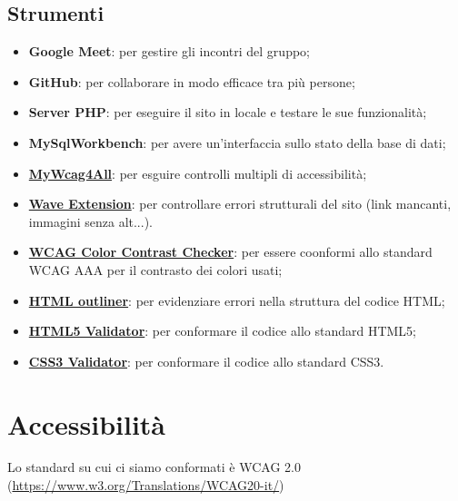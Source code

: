 \documentclass{template}
\begin{document}
	\subsection{Strumenti}
	\begin{itemize}
		\item \textbf{Google Meet}: per gestire gli incontri del gruppo;
		\item \textbf{GitHub}: per collaborare in modo efficace tra più persone;
		\item \textbf{Server PHP}: per eseguire il sito in locale e testare le sue funzionalità;
		\item \textbf{MySqlWorkbench}: per avere un'interfaccia sullo stato della base di dati;
		\item \href{https://web.math.unipd.it/accessibility-dev/}{\textbf{MyWcag4All}}: per esguire controlli multipli di accessibilità;
		\item \href{https://wave.webaim.org/extension/}{\textbf{Wave Extension}}: per controllare errori strutturali del sito (link mancanti, immagini senza alt...).
		\item \href{https://chrome.google.com/webstore/detail/wcag-color-contrast-check/plnahcmalebffmaghcpcmpaciebdhgdf}{\textbf{WCAG Color Contrast Checker}}: per essere coonformi allo standard WCAG AAA per il contrasto dei colori usati;
		\item \href{https://gsnedders.html5.org/outliner/}{\textbf{HTML outliner}}: per evidenziare errori nella struttura del codice HTML;
		\item \href{https://validator.w3.org/}{\textbf{HTML5 Validator}}: per conformare il codice allo standard HTML5;
		\item \href{https://jigsaw.w3.org/css-validator/}{\textbf{CSS3 Validator}}: per conformare il codice allo standard CSS3.
	\end{itemize}

	\section{Accessibilità}
	Lo standard su cui ci siamo conformati è WCAG 2.0 (\href{https://www.w3.org/Translations/WCAG20-it/}{https://www.w3.org/Translations/WCAG20-it/})
\end{document}
